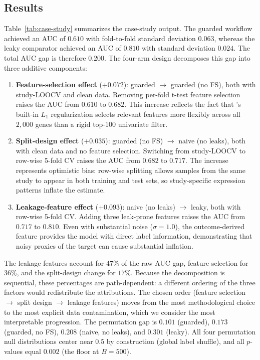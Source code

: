 \documentclass[article,shortnames]{jss}
\begin{document}
\subsection{Results}

Table~\ref{tab:case-study} summarizes the case-study output. The guarded
workflow achieved an AUC of $0.610$ with fold-to-fold standard deviation
$0.063$, whereas the leaky comparator achieved an AUC of $0.810$ with standard
deviation $0.024$. The total AUC gap is therefore $0.200$. The four-arm design
decomposes this gap into three additive components:
\begin{enumerate}
\item \textbf{Feature-selection effect} ($+0.072$): guarded $\to$ guarded (no FS), both
  with study-LOOCV and clean data. Removing per-fold t-test feature selection
  raises the AUC from $0.610$ to $0.682$. This increase reflects the fact that
  's built-in $L_1$ regularization selects relevant features more
  flexibly across all $2{,}000$ genes than a rigid top-100 univariate filter.
\item \textbf{Split-design effect} ($+0.035$): guarded (no FS) $\to$ naive
  (no leaks), both with clean data and no feature selection. Switching from
  study-LOOCV to row-wise 5-fold CV raises the AUC from $0.682$ to $0.717$.
  The increase represents optimistic bias: row-wise splitting allows samples
  from the same study to appear in both training and test sets, so
  study-specific expression patterns inflate the estimate.
\item \textbf{Leakage-feature effect} ($+0.093$): naive (no leaks) $\to$ leaky,
  both with row-wise 5-fold CV. Adding three leak-prone features raises the
  AUC from $0.717$ to $0.810$. Even with substantial noise ($\sigma = 1.0$),
  the outcome-derived feature provides the model with direct label information,
  demonstrating that noisy proxies of the target can cause substantial
  inflation.
\end{enumerate}
The leakage features account for $47\%$ of the raw AUC gap, feature selection
for $36\%$, and the split-design change for $17\%$. Because the decomposition
is sequential, these percentages are path-dependent: a different ordering of
the three factors would redistribute the attributions. The chosen order
(feature selection $\to$ split design $\to$ leakage features) moves from the
most methodological choice to the most explicit data contamination, which we
consider the most interpretable progression.  The permutation gap is
$0.101$ (guarded), $0.173$ (guarded, no FS), $0.208$ (naive, no leaks), and
$0.301$ (leaky). All four permutation null distributions center near $0.5$
by construction (global label shuffle), and all $p$-values equal $0.002$
(the floor at $B = 500$).
\end{document}
